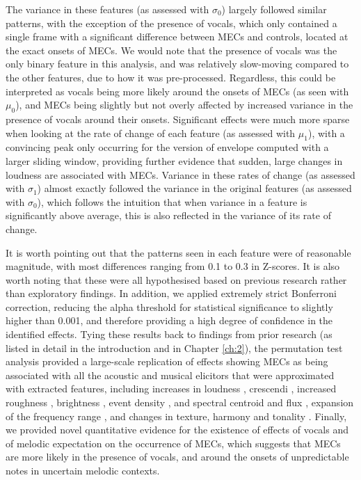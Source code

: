 The variance in these features (as assessed with $\sigma_0$) largely followed similar patterns, with the exception of the presence of vocals, which only contained a single frame with a significant difference between MECs and controls, located at the exact onsets of MECs. We would note that the presence of vocals was the only binary feature in this analysis, and was relatively slow-moving compared to the other features, due to how it was pre-processed. Regardless, this could be interpreted as vocals being more likely around the onsets of MECs (as seen with $\mu_0$), and MECs being slightly but not overly affected by increased variance in the presence of vocals around their onsets. Significant effects were much more sparse when looking at the rate of change of each feature (as assessed with $\mu_1$), with a convincing peak only occurring for the version of envelope computed with a larger sliding window, providing further evidence that sudden, large changes in loudness are associated with MECs. Variance in these rates of change (as assessed with $\sigma_1$) almost exactly followed the variance in the original features (as assessed with $\sigma_0$), which follows the intuition that when variance in a feature is significantly above average, this is also reflected in the variance of its rate of change.

It is worth pointing out that the patterns seen in each feature were of reasonable magnitude, with most differences ranging from 0.1 to 0.3 in Z-scores. It is also worth noting that these were all hypothesised based on previous research rather than exploratory findings. In addition, we applied extremely strict Bonferroni correction, reducing the alpha threshold for statistical significance to slightly higher than 0.001, and therefore providing a high degree of confidence in the identified effects. Tying these results back to findings from prior research (as listed in detail in the introduction and in Chapter \ref{ch:2}), the permutation test analysis provided a large-scale replication of effects showing MECs as being associated with all the acoustic and musical elicitors that were approximated with extracted features, including increases in loudness \parencite[e.g.,][]{sloboda1991}, crescendi \parencite[e.g.,][]{panksepp1995}, increased roughness \parencite[e.g.,][]{grewe2007}, brightness \parencite[e.g.,][]{bannister2018}, event density \parencite[e.g.,][]{nagel2008}, and spectral centroid and flux \parencite[e.g.,][]{bannister2018}, expansion of the frequency range \parencite[e.g.,][]{guhn2007}, and changes in texture, harmony and tonality \parencite[e.g.,][]{sloboda1991}. Finally, we provided novel quantitative evidence for the existence of effects of vocals and of melodic expectation on the occurrence of MECs, which suggests that MECs are more likely in the presence of vocals, and around the onsets of unpredictable notes in uncertain melodic contexts.

